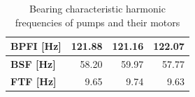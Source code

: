 \begin{table}[h]
\begin{tabular}{|l|r|r|r|}
\textbf{BPFI {[}Hz{]}} & 121.88                                  & 121.16                                  & 122.07                                        \\ \hline
\textbf{BSF {[}Hz{]}}  & 58.20                                   & 59.97                                   & 57.77                                         \\ \hline
\textbf{FTF {[}Hz{]}}  & 9.65                                    & 9.74                                    & 9.63                                          \\ \hline
\end{tabular}
\caption{Bearing characteristic harmonic frequencies of pumps and their motors}
\label{tab:evaluation:bearing-freq-pump}
\end{table}

